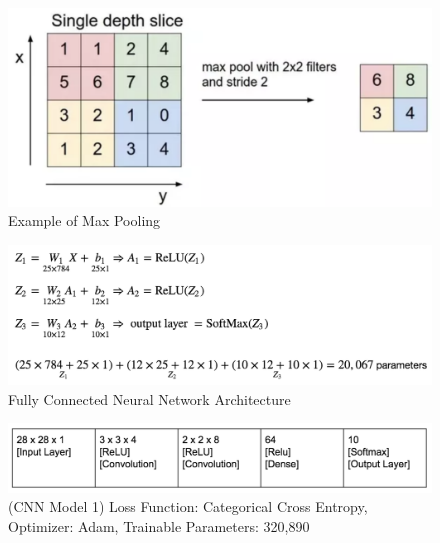 \documentclass[11pt]{article}
\begin{document}
\begin{figure}[h!]
  \begin{center}
    \includegraphics[scale=0.5]{fig7}
  \end{center}
  \caption{Example of Max Pooling}
  \label{fig:CNNPooling}
  \end{figure}


\begin{figure}[h!]
  \begin{center}
    \includegraphics[scale=0.75]{fig2}
    \end{center}
  \caption{Fully Connected Neural Network Architecture}
  \label{fig:fcnn}
\end{figure}


\begin{figure}[h!]
  \begin{center}
    \includegraphics[scale=0.5]{fig3}
    \end{center}
  \caption{(CNN Model 1) Loss Function: Categorical Cross Entropy, Optimizer:
    Adam, Trainable Parameters: 320,890}
  \label{fig:cnnArch}
\end{figure}
\end{document}
